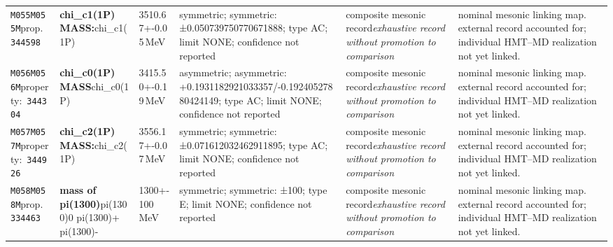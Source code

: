 \begin{landscape}
\begin{longtable}{L{1.85cm}L{4.45cm}L{2.35cm}L{4.05cm}L{3.35cm}L{7.15cm}}
\texttt{M055}\newline \texttt{M055M}\newline prop.\ \texttt{344598} & \textbf{chi\_\allowbreak{}c1(1P) MASS:}\newline chi\_\allowbreak{}c1(1P) & 3510.67+-0.05\,MeV & symmetric; symmetric: ±0.050739750770671888; type AC; limit NONE; confidence not reported & composite mesonic record\newline \emph{exhaustive record without promotion to comparison} & nominal mesonic linking map. external record accounted for; individual HMT--MD realization not yet linked. \\
\texttt{M056}\newline \texttt{M056M}\newline property:\ \texttt{344304} & \textbf{chi\_\allowbreak{}c0(1P) MASS}\newline chi\_\allowbreak{}c0(1P) & 3415.50+-0.19\,MeV & asymmetric; asymmetric: +0.1931182921033357/-0.19240527880424149; type AC; limit NONE; confidence not reported & composite mesonic record\newline \emph{exhaustive record without promotion to comparison} & nominal mesonic linking map. external record accounted for; individual HMT--MD realization not yet linked. \\
\texttt{M057}\newline \texttt{M057M}\newline property:\ \texttt{344926} & \textbf{chi\_\allowbreak{}c2(1P) MASS:}\newline chi\_\allowbreak{}c2(1P) & 3556.17+-0.07\,MeV & symmetric; symmetric: ±0.071612032462911895; type AC; limit NONE; confidence not reported & composite mesonic record\newline \emph{exhaustive record without promotion to comparison} & nominal mesonic linking map. external record accounted for; individual HMT--MD realization not yet linked. \\
\texttt{M058}\newline \texttt{M058M}\newline prop.\ \texttt{334463} & \textbf{mass of pi(1300)}\newline pi(1300)0 \textbar{}\allowbreak{} pi(1300)+ \textbar{}\allowbreak{} pi(1300)- & 1300+-100\,MeV & symmetric; symmetric: ±100; type E; limit NONE; confidence not reported & composite mesonic record\newline \emph{exhaustive record without promotion to comparison} & nominal mesonic linking map. external record accounted for; individual HMT--MD realization not yet linked. \\

\end{longtable}
\end{landscape}
